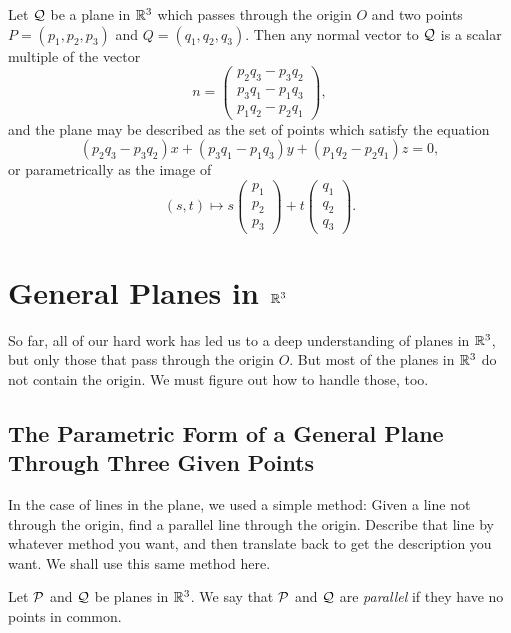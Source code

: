 \documentclass[00-livre-main.tex]{subfiles}
\begin{document}
\begin{theorem}\label{thm:plane-2-points}
Let $\mathcal{Q}$ be a plane in $\mathbb{R}^3$ which passes through the origin $O$ and two points $P = (p_1,p_2,p_3)$ and $Q=(q_1,q_2,q_3)$. Then any normal vector to $\mathcal{Q}$ is a scalar multiple of the vector
\[
n = \begin{pmatrix} p_2 q_3 - p_3 q_2 \\
p_3 q_1 - p_1 q_3 \\ p_1 q_2 - p_2 q_1 \end{pmatrix},
\]
and the plane may be described as the set of points which satisfy the equation
\[
(p_2 q_3 - p_3 q_2) x +
(p_3 q_1 - p_1 q_3) y +
(p_1 q_2 - p_2 q_1) z = 0,
\]
or parametrically as the image of 
\[
(s,t) \mapsto s \begin{pmatrix} p_1 \\ p_2 \\ p_3 \end{pmatrix} + t \begin{pmatrix} q_1 \\ q_2 \\ q_3 \end{pmatrix}.
\]
\end{theorem}

\section*{General Planes in $\mathbb{R}^3$}

So far, all of our hard work has led us to a deep understanding of planes in $\mathbb{R}^3$, but only those that pass through the origin $O$. But most of the planes in $\mathbb{R}^3$ do not contain the origin. We must figure out how to handle those, too.

\subsection*{The Parametric Form of a General Plane Through Three Given Points}

In the case of lines in the plane, we used a simple method: Given a line not through the origin, find a parallel line through the origin. Describe that line by whatever method you want, and then translate back to get the description you want. We shall use this same method here. 

\begin{definition}
Let $\mathcal{P}$ and $\mathcal{Q}$ be planes in $\mathbb{R}^3$. We say that $\mathcal{P}$ and $\mathcal{Q}$ are \emph{parallel} if they have no points in common.
\end{definition}
\end{document}
